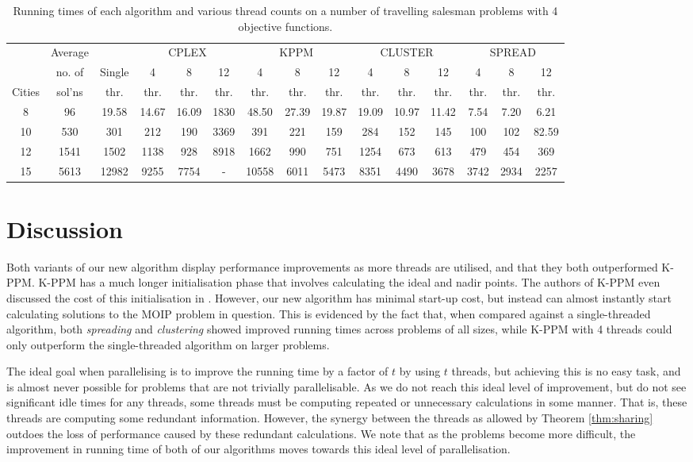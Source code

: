 \documentclass{amsart}
\theoremstyle{definition}
\begin{document}
\begin{table}\footnotesize
\begin{tabular}{c|c|c|ccc|ccc|ccc|ccc}
  & Average & & \multicolumn{3}{c|}{CPLEX}& \multicolumn{3}{c|}{KPPM}& \multicolumn{3}{c|}{CLUSTER} & \multicolumn{3}{c}{SPREAD}\\
& no. of & Single & 4 & 8 & 12 & 4 & 8 & 12 & 4 & 8 & 12 & 4 & 8 & 12\\
Cities & sol'ns & thr. & thr. & thr. & thr. & thr. & thr. & thr. & thr. & thr. & thr. & thr. & thr. & thr. \\
\hline
8 & 96 & 19.58 & 14.67 & 16.09 & 1830 & 48.50 & 27.39 & 19.87 & 19.09 & 10.97 & 11.42 & 7.54 & 7.20 & 6.21 \\ 
10 & 530 & 301 & 212 & 190 & 3369 & 391 & 221 & 159 & 284 & 152 & 145 & 100 & 102 & 82.59 \\ 
12 & 1541 & 1502 & 1138 & 928 & 8918 & 1662 & 990 & 751 & 1254 & 673 & 613 & 479 & 454 & 369 \\ 
15 & 5613 & 12982 & 9255 & 7754 & - & 10558 & 6011 & 5473 & 8351 & 4490 & 3678 & 3742 & 2934 & 2257 \\ 

\end{tabular}
\caption{Running times of each algorithm and various thread counts on a number of travelling salesman problems with 4 objective functions.}
\label{tab:tsp}
\end{table}

\section{Discussion}\label{sec:discussion}

Both variants of our new algorithm display performance improvements as more threads are utilised, and that they both outperformed K-PPM.
K-PPM has a much longer initialisation phase that involves calculating the ideal and nadir points.
The authors of K-PPM even discussed the cost of this initialisation in \cite{Dhaenens2010KPPM}.
However, our new algorithm has minimal start-up cost, but instead can almost instantly start calculating solutions to the MOIP problem in question.
This is evidenced by the fact that, when compared against a single-threaded algorithm, both \emph{spreading} and \emph{clustering} showed improved running times across problems of all sizes, while K-PPM with 4 threads could only outperform the single-threaded algorithm on larger problems.

The ideal goal when parallelising is to improve the running time by a factor of $t$ by using $t$ threads, but achieving this is no easy task, and is almost never possible for problems that are not trivially parallelisable.
As we do not reach this ideal level of improvement, but do not see significant idle times for any threads, some threads must be computing repeated or unnecessary calculations in some manner.
That is, these threads are computing some redundant information.
However, the synergy between the threads as allowed by Theorem \ref{thm:sharing} outdoes the loss of performance caused by these redundant calculations.
We note that as the problems become more difficult, the improvement in running time of both of our algorithms moves towards this ideal level of parallelisation.
\end{document}
